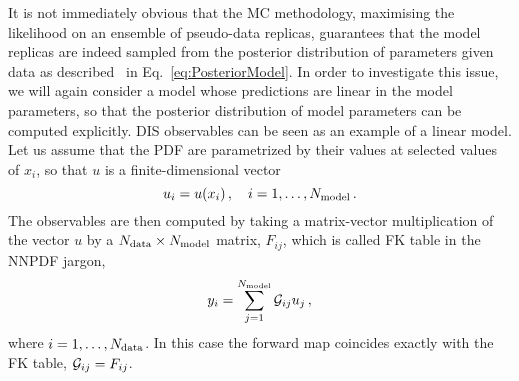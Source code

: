 It is not immediately obvious that the MC methodology, maximising the likelihood
on an ensemble of pseudo-data replicas, guarantees that the model replicas
are indeed sampled from the posterior distribution of parameters given data as
described \eg\ in Eq.~\ref{eq:PosteriorModel}. In order to investigate this
issue, we will again consider a model whose predictions are linear in the model
parameters, so that the posterior distribution of model parameters can be computed
explicitly. DIS observables can be seen as an example of a linear model. Let us assume 
that the PDF are parametrized by their values at selected values of $x_i$, so that
$u$ is a finite-dimensional vector 
\begin{equation}
    \label{eq:Uvector}
    u_i = u(x_i)\, , \quad i = 1, \ldots, N_{\rm model}\, .    
\end{equation}
The observables are then computed by taking a matrix-vector multiplication of the 
vector $u$ by a $N_{\rm data} \times N_{\rm model}$ matrix, $F_{ij}$, which is called FK table in the 
NNPDF jargon, 
\begin{equation}
    \label{eq:FKTabLinVec}
    y_i = \sum_{j=1}^{N_{\rm model}} \mathcal{G}_{ij} u_j\, ,
\end{equation}
where $i=1,\ldots,N_{\rm data}$. In this case the forward map coincides exactly with the 
FK table, $\mathcal{G}_{ij} = F_{ij}$. 

